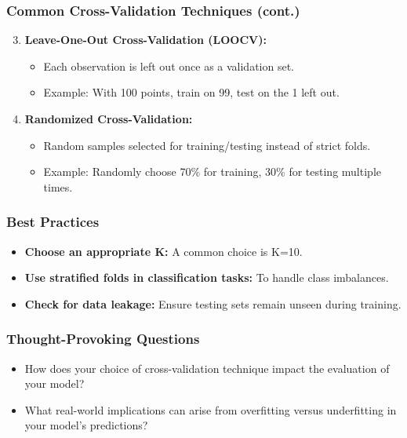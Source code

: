 \documentclass[aspectratio=169]{beamer}
\begin{document}
\begin{frame}[fragile]
    \frametitle{Common Cross-Validation Techniques (cont.)}
    \begin{enumerate}
        \setcounter{enumi}{2}
        \item \textbf{Leave-One-Out Cross-Validation (LOOCV):}
            \begin{itemize}
                \item Each observation is left out once as a validation set.
                \item Example: With 100 points, train on 99, test on the 1 left out.
            \end{itemize}
        \item \textbf{Randomized Cross-Validation:}
            \begin{itemize}
                \item Random samples selected for training/testing instead of strict folds.
                \item Example: Randomly choose 70\% for training, 30\% for testing multiple times.
            \end{itemize}
    \end{enumerate}
\end{frame}

\begin{frame}[fragile]
    \frametitle{Best Practices}
    \begin{itemize}
        \item \textbf{Choose an appropriate K:} A common choice is K=10.
        \item \textbf{Use stratified folds in classification tasks:} To handle class imbalances.
        \item \textbf{Check for data leakage:} Ensure testing sets remain unseen during training.
    \end{itemize}
\end{frame}

\begin{frame}[fragile]
    \frametitle{Thought-Provoking Questions}
    \begin{itemize}
        \item How does your choice of cross-validation technique impact the evaluation of your model?
        \item What real-world implications can arise from overfitting versus underfitting in your model's predictions?
    \end{itemize}
\end{frame}
\end{document}

